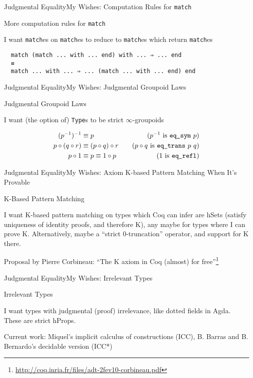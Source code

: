 \documentclass{beamer}
\begin{document}
\begin{frame}[fragile]{Judgmental Equality}{My Wishes: Computation Rules for \texorpdfstring{\texttt{match}}{match}}
  \Large
  \begin{center}
    More computation rules for \texttt{match}
  \end{center}
  I want \texttt{match}es on \texttt{match}es to reduce to \texttt{match}es which return \texttt{match}es
\begin{verbatim}
  match (match ... with ... end) with ... ⇒ ... end
  ≡
  match ... with ... ⇒ ... (match ... with ... end) end
\end{verbatim}
\end{frame}

\begin{frame}[fragile]{Judgmental Equality}{My Wishes: Judgmental Groupoid Laws}
  \Large
  \begin{center}
    Judgmental Groupoid Laws
  \end{center}
  I want (the option of) \texttt{Type}s to be strict $\infty$-groupoids
  
  \begin{align*}
    (p^{-1})^{-1} & \equiv p & \text{($p^{-1}$ is \texttt{eq\_sym} $p$)} \\
    p \circ (q \circ r) & \equiv (p \circ q) \circ r\quad & \text{($p \circ q$ is \texttt{eq\_trans} $p$ $q$)} \\
    p \circ 1 & \equiv p \equiv 1 \circ p & \text{(1 is \texttt{eq\_refl})}
  \end{align*}
\end{frame}

\begin{frame}[fragile]{Judgmental Equality}{My Wishes: Axiom K-based Pattern Matching When It's Provable}
  \Large
  \begin{center}
    K-Based Pattern Matching
  \end{center}
  I want K-based pattern matching on types which Coq can infer are hSets (satisfy uniqueness of identity proofs, and therefore K), any maybe for types where I can prove K. \pause  Alternatively, maybe a ``strict 0-truncation'' operator, and support for K there. \pause
  
  Proposal by Pierre Corbineau: ``The K axiom in Coq (almost) for free''\footnote<2->{\url{http://coq.inria.fr/files/adt-2fev10-corbineau.pdf}}
\end{frame}

\begin{frame}[fragile]{Judgmental Equality}{My Wishes: Irrelevant Types}
  \Large
  \begin{center}
    Irrelevant Types
  \end{center}
  I want types with judgmental (proof) irrelevance, like dotted fields in Agda. \pause  These are strict hProps.  \pause
  
  Current work: Miquel's implicit calculus of constructions (ICC), B. Barras and B. Bernardo's decidable version (ICC*)
\end{frame}
\end{document}
